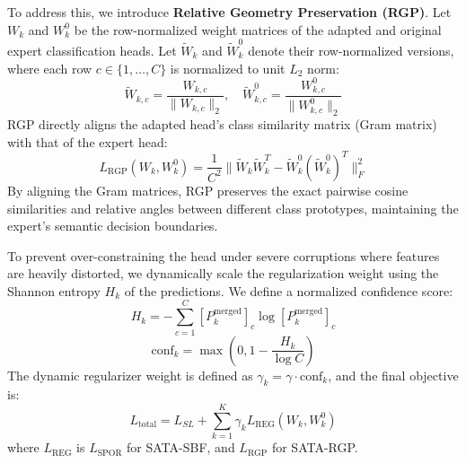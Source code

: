 \documentclass{article}
\begin{document}
To address this, we introduce \textbf{Relative Geometry Preservation (RGP)}. Let $W_k$ and $W^0_k$ be the row-normalized weight matrices of the adapted and original expert classification heads. Let $\tilde{W}_k$ and $\tilde{W}^0_k$ denote their row-normalized versions, where each row $c \in \{1,\dots,C\}$ is normalized to unit $L_2$ norm:
\begin{equation}
    \tilde{W}_{k, c} = \frac{W_{k, c}}{\| W_{k, c} \|_2}, \quad \tilde{W}^0_{k, c} = \frac{W^0_{k, c}}{\| W^0_{k, c} \|_2}
\end{equation}
RGP directly aligns the adapted head's class similarity matrix (Gram matrix) with that of the expert head:
\begin{equation}
    L_{\text{RGP}}(W_k, W^0_k) = \frac{1}{C^2} \| \tilde{W}_k \tilde{W}_k^T - \tilde{W}^0_k (\tilde{W}^0_k)^T \|_F^2
\end{equation}
By aligning the Gram matrices, RGP preserves the exact pairwise cosine similarities and relative angles between different class prototypes, maintaining the expert's semantic decision boundaries.

To prevent over-constraining the head under severe corruptions where features are heavily distorted, we dynamically scale the regularization weight using the Shannon entropy $H_k$ of the predictions. We define a normalized confidence score:
\begin{equation}
    H_k = -\sum_{c=1}^C [P^{\text{merged}}_k]_c \log [P^{\text{merged}}_k]_c
\end{equation}
\begin{equation}
    \text{conf}_k = \max \left( 0, 1 - \frac{H_k}{\log C} \right)
\end{equation}
The dynamic regularizer weight is defined as $\gamma_k = \gamma \cdot \text{conf}_k$, and the final objective is:
\begin{equation}
    L_{\text{total}} = L_{SL} + \sum_{k=1}^K \gamma_k L_{\text{REG}}(W_k, W^0_k)
\end{equation}
where $L_{\text{REG}}$ is $L_{\text{SPOR}}$ for SATA-SBF, and $L_{\text{RGP}}$ for SATA-RGP.
\end{document}
